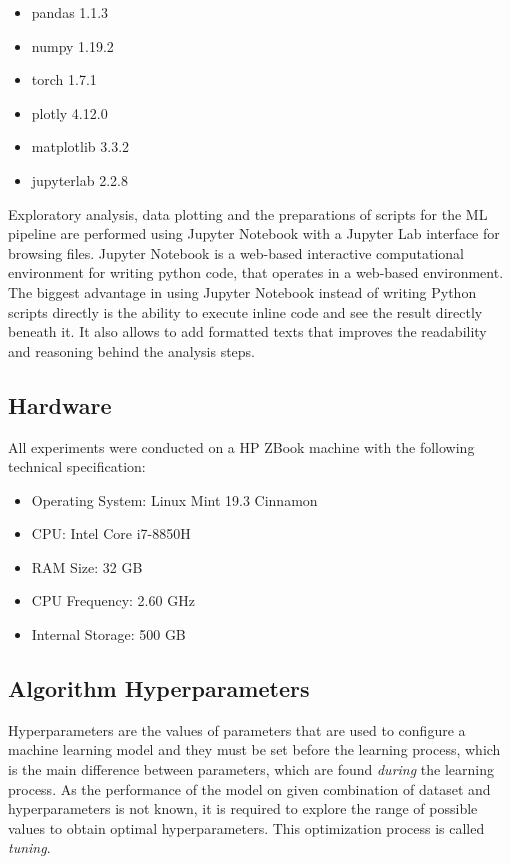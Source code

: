\begin{itemize}
    \item pandas 1.1.3
    \item numpy 1.19.2
    \item torch 1.7.1
    \item plotly 4.12.0
    \item matplotlib 3.3.2
    \item jupyterlab 2.2.8
\end{itemize}

Exploratory analysis, data plotting and the preparations of scripts for the ML pipeline are performed using Jupyter Notebook with a Jupyter Lab interface for browsing files. Jupyter Notebook is a web-based interactive computational environment for writing python code, that operates in a web-based environment. The biggest advantage in using Jupyter Notebook instead of writing Python scripts directly is the ability to execute inline code and see the result directly beneath it. It also allows to add formatted texts that improves the readability and reasoning behind the analysis steps.

\subsection{Hardware}
All experiments were conducted on a HP ZBook machine with the following technical specification:
\begin{itemize}
    \item Operating System: Linux Mint 19.3 Cinnamon
    \item CPU: Intel Core i7-8850H
    \item RAM Size: 32 GB
    \item CPU Frequency: 2.60 GHz
    \item Internal Storage: 500 GB
\end{itemize}

\subsection{Algorithm Hyperparameters}
Hyperparameters are the values of parameters that are used to configure a machine learning model and they must be set before the learning process, which is the main difference between parameters, which are found \textit{during} the learning process. As the performance of the model on given combination of dataset and hyperparameters is not known, it is required to explore the range of possible values to obtain optimal hyperparameters. This optimization process is called \textit{tuning}.

